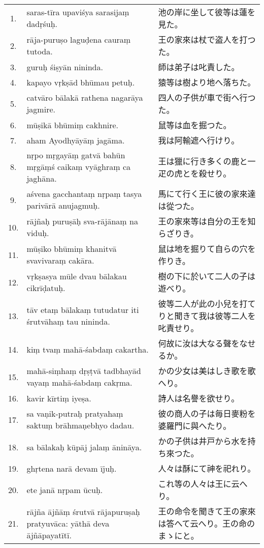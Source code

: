 \begin{longtable}{c*{2}{p{0.45\hsize}}}
 1. & saras-tīra upaviśya sarasi\-jaṃ dadṛśuḥ. & 池の岸に坐して彼等は蓮を見た。\\
 2. & rāja-puruṣo laguḍena cauraṃ tutoda. & 王の家來は杖で盗人を打つた。\\
 3. & guruḥ śiṣyān nininda. & 師は弟子は叱責した。\\
 4. & kapayo vṛkṣād bhūmau petuḥ. & 猿等は樹より地へ落ちた。\\
 5. & catvāro bālakā rathena naga\-rāya jagmire. & 四人の子供が車で街へ行つた。\\
 6. & mūṣikā bhūmiṃ cakhnire. & 鼠等は血を掘つた。\\
 7. & aham Ayodhyāyāṃ jagāma. & 我は阿輸遮へ行けり。\\
 8. & nṛpo mṛgayāṃ gatvā bahūn mṛgāṃś caikaṃ vyāghraṃ ca jaghāna.
 & 王は獵に行き多くの鹿と一疋の虎とを殺せり。\\
 9. & aśvena gacchantaṃ nṛpaṃ tasya parivārā anujagmuḥ. & 馬にて行く王に彼の家來達
は從つた。\\
10. & rājñaḥ puruṣāḥ sva-rājānaṃ na viduḥ. & 王の家來等は自分の王を知
らざりき。\\
11. & mūṣiko bhūmiṃ khanitvā sva\-vivaraṃ cakāra. & 鼠は地を掘りて自らの穴を作りき。\\
12. & vṛkṣasya mūle dvau bālakau cikrīḍatuḥ. & 樹の下に於いて二人の子は遊べり。\\
13. & tāv etaṃ bālakaṃ tutudatur iti śrutvāhaṃ tau nininda. & 彼等二人が此の小兒を打て
りと聞きて我は彼等二人を叱責せり。\\
14. & kiṃ tvaṃ mahā-śabdaṃ ca\-kartha. & 何故に汝は大なる聲をなせるか。\\
15. & mahā-siṃhaṃ dṛṣṭvā tad\-bhayād vayaṃ mahā-śabdaṃ cakṛma. & かの少女は美はしき歌を歌へり。\\
16. & kavir kīrtiṃ iyeṣa. & 詩人は名譽を欲せり。\\
17. & sa vaṇik-putraḥ pratyahaṃ saktuṃ brāhmaṇebhyo dadau. & 彼の商人の子は毎日麥粉を
婆羅門に與へたり。\\
18. & sa bālakaḥ kūpāj jalaṃ ānināya. & かの子供は井戸から水を持ち來つた。\\
19. & ghṛtena narā devam ījuḥ. & 人々は酥にて神を祀れり。\\
20. & ete janā nṛpam ūcuḥ. & これ等の人々は王に云へり。\\
21. & rājña ājñāṃ śrutvā rāja\-puruṣaḥ pratyuvāca: yāthā deva ājñāpayatītī.
& 王の命令を聞きて王の家來は答へて云へり。王の命のまゝにと。\\

\end{longtable}
